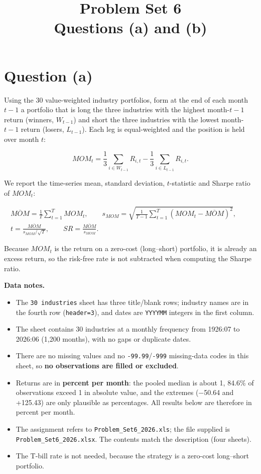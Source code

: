 \documentclass[11pt]{article}
\title{Problem Set 6\\[2pt]\large Questions (a) and (b)}
\author{}
\date{}
\begin{document}
\maketitle
\vspace{-2.5em}
\section*{Question (a)}
 
Using the 30 value-weighted industry portfolios, form at the end of each month $t-1$ a portfolio that is long the three industries with the highest month-$t-1$ return (winners, $W_{t-1}$) and short the three industries with the lowest month-$t-1$ return (losers, $L_{t-1}$). Each leg is equal-weighted and the position is held over month $t$:
 
\begin{equation*}
MOM_t=\frac{1}{3}\sum_{i\in W_{t-1}}R_{i,t}-\frac{1}{3}\sum_{i\in L_{t-1}}R_{i,t}.
\end{equation*}
 
We report the time-series mean, standard deviation, $t$-statistic and Sharpe ratio of $MOM_t$:
 
\begin{gather*}
\overline{MOM}=\frac{1}{T}\sum_{t=1}^{T}MOM_t,\qquad
s_{MOM}=\sqrt{\frac{1}{T-1}\sum_{t=1}^{T}\left(MOM_t-\overline{MOM}\right)^2},\qquad \\
t=\frac{\overline{MOM}}{s_{MOM}/\sqrt{T}},\qquad
SR=\frac{\overline{MOM}}{s_{MOM}}.
\end{gather*}
 
Because $MOM_t$ is the return on a zero-cost (long–short) portfolio, it is already an excess return, so the risk-free rate is not subtracted when computing the Sharpe ratio.
 
\textbf{Data notes.}
\begin{itemize}
  \item The \texttt{30 industries} sheet has three title/blank rows; industry names are in the fourth row (\texttt{header=3}), and dates are \texttt{YYYYMM} integers in the first column.
  \item The sheet contains 30 industries at a monthly frequency from 1926:07 to 2026:06 (1,200 months), with no gaps or duplicate dates.
  \item There are no missing values and no \texttt{-99.99}/\texttt{-999} missing-data codes in this sheet, so \textbf{no observations are filled or excluded}.
  \item Returns are in \textbf{percent per month}: the pooled median is about 1, 84.6\% of observations exceed 1 in absolute value, and the extremes (−50.64 and +125.43) are only plausible as percentages. All results below are therefore in percent per month.
  \item The assignment refers to \texttt{Problem\_\allowbreak{}Set6\_\allowbreak{}2026.xls}; the file supplied is \texttt{Problem\_\allowbreak{}Set6\_\allowbreak{}2026.xlsx}. The contents match the description (four sheets).
  \item The T-bill rate is not needed, because the strategy is a zero-cost long–short portfolio.
\end{itemize}
 
\end{document}
